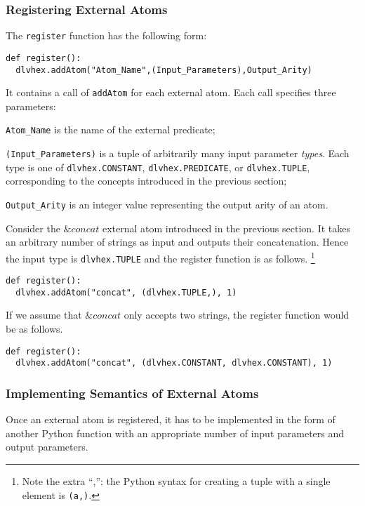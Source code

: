 \documentclass[a4paper, titlepage]{article}
\newcommand{\amp}[1]{\ensuremath{\&{\mathit{#1}}}}
\begin{document}
\subsubsection{Registering External Atoms}
\label{registerExtAtom}
%
The \verb+register+ function has the following form:
%
\begin{verbatim} 
def register():
  dlvhex.addAtom("Atom_Name",(Input_Parameters),Output_Arity) 
\end{verbatim}
%
It contains a call of \verb+addAtom+ for each external atom.
Each call specifies three parameters:
%
\begin{compactitem}
\item
  \verb+Atom_Name+ is the name of the external predicate;
\item
  \verb+(Input_Parameters)+ is a tuple of
  arbitrarily many input parameter \emph{types}.
  Each type is one of \verb+dlvhex.CONSTANT+, \verb+dlvhex.PREDICATE+, or 
  \verb+dlvhex.TUPLE+,
  corresponding to the concepts introduced in the previous section;
\item
  \verb+Output_Arity+ is an integer value
  representing the output arity of an atom.
\end{compactitem}
%
Consider the $\mathit{\&concat}$ external atom
introduced in the previous section.
It takes an arbitrary number of strings as input
and outputs their concatenation.
Hence the input type is \verb|dlvhex.TUPLE|
and the register function is as follows.%
\footnote{Note the extra ``,'': the Python syntax for creating a tuple
with a single element is \texttt{(a,)}.}
\begin{verbatim}
def register():
  dlvhex.addAtom("concat", (dlvhex.TUPLE,), 1)  
\end{verbatim}
If we assume that $\amp{concat}$ only accepts two strings,
the register function would be as follows.
\begin{verbatim}
def register():
  dlvhex.addAtom("concat", (dlvhex.CONSTANT, dlvhex.CONSTANT), 1)  
\end{verbatim}

\subsubsection{Implementing Semantics of External Atoms}
Once an external atom is registered,
it has to be implemented in the form of another Python function 
with an appropriate number of input parameters and output parameters.
\end{document}
